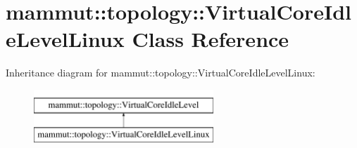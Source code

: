 \hypertarget{classmammut_1_1topology_1_1VirtualCoreIdleLevelLinux}{\section{mammut\-:\-:topology\-:\-:Virtual\-Core\-Idle\-Level\-Linux Class Reference}
\label{classmammut_1_1topology_1_1VirtualCoreIdleLevelLinux}
}
Inheritance diagram for mammut\-:\-:topology\-:\-:Virtual\-Core\-Idle\-Level\-Linux\-:\begin{figure}[H]
\begin{center}
\leavevmode
\includegraphics[height=2.000000cm]{classmammut_1_1topology_1_1VirtualCoreIdleLevelLinux}
\end{center}
\end{figure}
